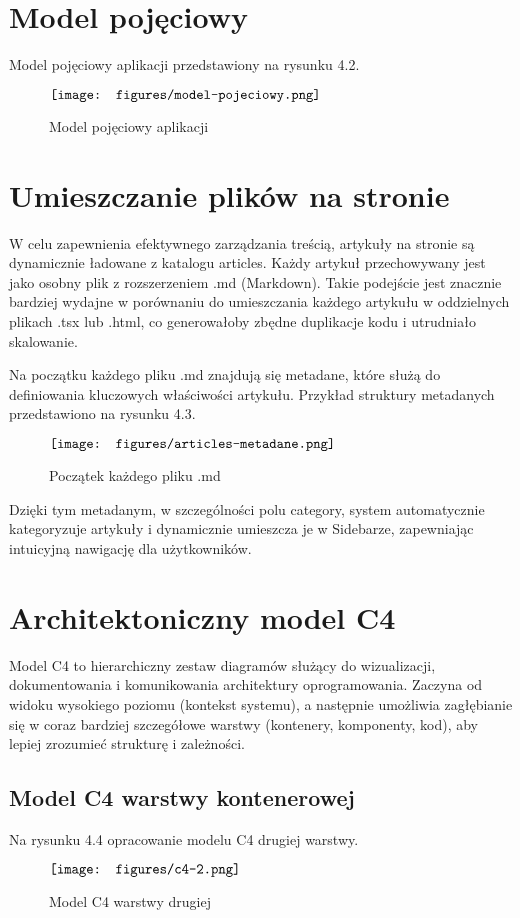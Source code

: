 \documentclass[shortabstract,inz]{iithesis}
\begin{document}
\newpage

\section{Model pojęciowy}
Model pojęciowy aplikacji przedstawiony na rysunku 4.2.
\begin{figure}[H]
	\centering
	$\vcenter{\hbox{\texttt{[image: figures/model-pojeciowy.png]}}}$
    \caption[]{Model pojęciowy aplikacji}
    \label{fig:model-pojeciowy}
\end{figure}

\section{Umieszczanie plików na stronie}
W celu zapewnienia efektywnego zarządzania treścią, artykuły na stronie są dynamicznie ładowane z katalogu articles. Każdy artykuł przechowywany jest jako osobny plik z rozszerzeniem .md (Markdown). Takie podejście jest znacznie bardziej wydajne w porównaniu do umieszczania każdego artykułu w oddzielnych plikach .tsx lub .html, co generowałoby zbędne duplikacje kodu i utrudniało skalowanie.

Na początku każdego pliku .md znajdują się metadane, które służą do definiowania kluczowych właściwości artykułu. Przykład struktury metadanych przedstawiono na rysunku 4.3.

\begin{figure}[H]
	\centering
	$\vcenter{\hbox{\texttt{[image: figures/articles-metadane.png]}}}$
    \caption[]{Początek każdego pliku .md}
    \label{fig:articles-metadane}
\end{figure}

Dzięki tym metadanym, w szczególności polu category, system automatycznie kategoryzuje artykuły i dynamicznie umieszcza je w Sidebarze, zapewniając intuicyjną nawigację dla użytkowników.
\section{Architektoniczny model C4}

Model C4 to hierarchiczny zestaw diagramów służący do wizualizacji, dokumentowania i komunikowania architektury oprogramowania. Zaczyna od widoku wysokiego poziomu (kontekst systemu), a następnie umożliwia zagłębianie się w coraz bardziej szczegółowe warstwy (kontenery, komponenty, kod), aby lepiej zrozumieć strukturę i zależności.
\newpage
\subsection{Model C4 warstwy kontenerowej}
Na rysunku 4.4 opracowanie modelu C4 drugiej warstwy.
\begin{figure}[H]
	\centering
	$\vcenter{\hbox{\texttt{[image: figures/c4-2.png]}}}$
    \caption[]{Model C4 warstwy drugiej}
    \label{fig:model-c4-kontenerowa}
\end{figure}
\end{document}
